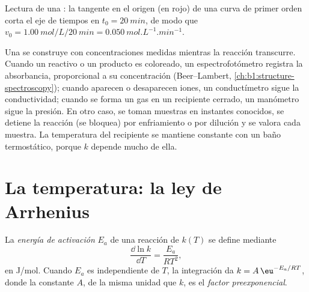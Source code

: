 \begin{omfigure}

{\small Lectura de una : la tangente en el origen (en
rojo) de una curva de primer orden corta el eje de tiempos en
$t_0 = \qty{20}{min}$, de modo que $v_0 =
\qty{1.00}{mol/L}/\qty{20}{min} = \qty{0.050}{mol.L^{-1}.min^{-1}}$.}
\end{omfigure}

\begin{inthelab}
Una  se construye con concentraciones medidas mientras la
reacción transcurre. Cuando un reactivo o un producto es coloreado, un
espectrofotómetro registra la absorbancia, proporcional a su
concentración (Beer--Lambert, \cref{ch:b1:structure-spectroscopy});
cuando aparecen o desaparecen iones, un conductímetro sigue la
conductividad; cuando se forma un gas en un recipiente cerrado, un
manómetro sigue la presión. En otro caso, se toman muestras en instantes
conocidos, se detiene la reacción (se bloquea) por enfriamiento o por
dilución y se valora cada muestra. La temperatura del recipiente se
mantiene constante con un baño termostático, porque $k$ depende mucho de
ella.
\end{inthelab}

\section{La temperatura: la ley de Arrhenius}

\begin{definition}\label{def:b1:rate-laws:activation-energy}
La \emph{energía de activación} $E_a$ de una
reacción de  $k(T)$ se define mediante
\[
  \frac{\dd \ln k}{\dd T} = \frac{E_a}{RT^2} ,
\]
en \unit{J/mol}. Cuando $E_a$ es independiente de $T$, la integración da
$k = A\,\eu^{-E_a/RT}$, donde la constante $A$, de la misma unidad que
$k$, es el \emph{factor preexponencial}.
\end{definition}


